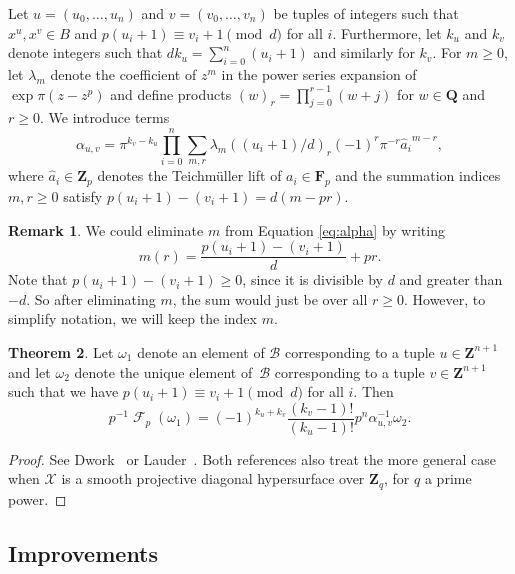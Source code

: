 \documentclass[a4paper,11pt]{article}
\numberwithin{equation}{section}
\newcommand{\ZZ}{\mathbf{Z}} %
\newcommand{\QQ}{\mathbf{Q}} %
\DeclareMathOperator{\Frob}{\mathcal{F}} %
\providecommand{\cB}{\mathcal{B}} %
\theoremstyle{definition}
\newtheorem{thm}{Theorem}[section]
\newtheorem{rem}[thm]{Remark}
\begin{document}
Let $u = (u_0, \dotsc, u_n)$ and $v = (v_0, \dotsc, v_n)$ be tuples 
of integers such that $x^u, x^v \in B$ and $p (u_i+1) \equiv v_i+1 \pmod{d}$
for all $i$. Furthermore, let $k_u$ and $k_v$ denote integers such that 
$d k_u = \sum_{i=0}^n (u_i + 1)$ and similarly for $k_v$.  For $m \geq 0$, 
let $\lambda_m$ denote the coefficient of $z^m$ in the power series expansion 
of $\exp \pi (z - z^p)$ and define products $(w)_r = \prod_{j=0}^{r-1} (w + j)$ 
for $w \in \QQ$ and $r \geq 0$. We introduce terms
\begin{equation} \label{eq:alpha}
\alpha_{u,v} = \pi^{k_v - k_u} \prod_{i = 0}^n \sum_{m, r} \lambda_m ((u_i + 1) / d)_r (-1)^r \pi^{-r} {\hat{a}_i}^{m-r},
\end{equation}
where $\hat{a}_i \in \ZZ_p$ denotes the Teichm\"uller lift of 
$a_i \in \mathbf{F}_p$ and the summation indices $m, r \geq 0$ 
satisfy $p (u_i+1) - (v_i+1) = d (m - pr)$.

\begin{rem}
We could eliminate $m$ from Equation \eqref{eq:alpha} by writing 
\[
m(r)=\frac{p(u_i+1) - (v_i+1)}{d}+pr.
\]
Note that $p(u_i+1) - (v_i+1) \geq 0$, since it is divisible by $d$ and greater than $-d$.
So after eliminating $m$, the sum would just be over all $r \geq 0$. However, to simplify
notation, we will keep the index $m$.
\end{rem}

\begin{thm} \label{thm:01-03-diagfrob}
Let $\omega_1$ denote an element of $\cB$ corresponding to a tuple 
$u \in \ZZ^{n+1}$ and let $\omega_2$ denote the unique element of~$\cB$ 
corresponding to a tuple $v \in \ZZ^{n+1}$ such that
we have $p (u_i + 1) \equiv v_i + 1 \pmod{d}$ for all $i$. Then
\begin{equation}
p^{-1} \Frob_p (\omega_1) = 
    (-1)^{k_u + k_v} \frac{(k_v - 1)!}{(k_u - 1)!} p^n \alpha_{u,v}^{-1} \omega_2.
\end{equation}
\end{thm}

\begin{proof}
See Dwork~\citep[\S 4]{Dwork1964} or Lauder~\citep[\S 6.1]{Lauder2004b}.  
Both references also treat the more general case when $\mathcal{X}$ is 
a smooth projective diagonal hypersurface over $\ZZ_q$, for $q$ a prime 
power.
\end{proof}

\subsection{Improvements}
\end{document}
